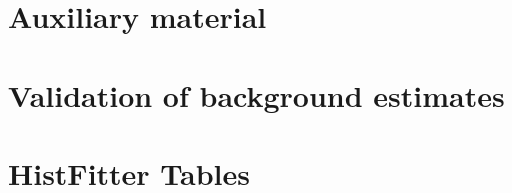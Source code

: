 \documentclass{outhesis}
\begin{document}
\chapter{Auxiliary material}\label{chap:aux}
\graphicspath{{figures/app/}}



\chapter{Validation of background estimates}\label{chap:app.bkg.val}
\graphicspath{{figures/app/}}
%

\chapter{HistFitter Tables}\label{app:HFtables}
\graphicspath{{figures/app/}}


%


\backmatter
\end{document}
